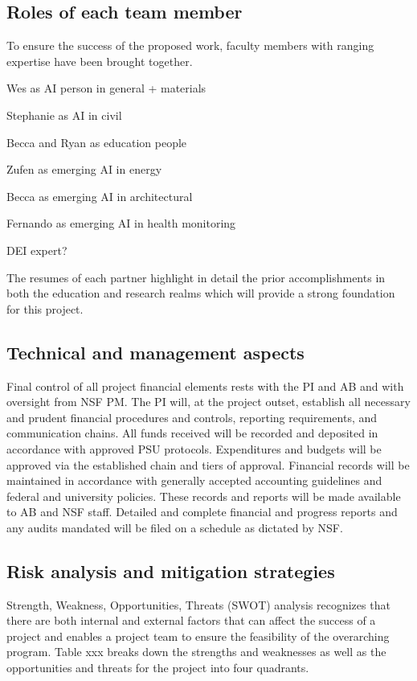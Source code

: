 \documentclass[11pt]{article}
\begin{document}
\subsection{Roles of each team member}
To ensure the success of the proposed work, faculty members with ranging expertise have been brought together. 

Wes as AI person in general + materials

Stephanie as AI in civil

Becca and Ryan as education people

Zufen as emerging AI in energy

Becca as emerging AI in architectural

Fernando as emerging AI in health monitoring 

DEI expert?

The resumes of each partner highlight in detail the prior accomplishments in both the education and research realms which will provide a strong foundation for this project. 


\subsection{Technical and management aspects}
Final control of all project financial elements rests with the PI and AB and with oversight from NSF PM.  The PI will, at the project outset, establish all necessary and prudent financial procedures and controls, reporting requirements, and communication chains. All funds received will be recorded and deposited in accordance with approved PSU protocols. Expenditures and budgets will be approved via the established chain and tiers of approval. Financial records will be maintained in accordance with generally accepted accounting guidelines and federal and university policies. These records and reports will be made available to AB and NSF staff. Detailed and complete financial and progress reports and any audits mandated will be filed on a schedule as dictated by NSF.

\subsection{Risk analysis and mitigation strategies}


Strength, Weakness, Opportunities, Threats (SWOT) analysis recognizes that there are both internal and external factors that can affect the success of a project and enables a project team to ensure the feasibility of the overarching program. 
Table xxx breaks down the strengths and weaknesses as well as the opportunities and threats for the project into four quadrants. 
\end{document}
